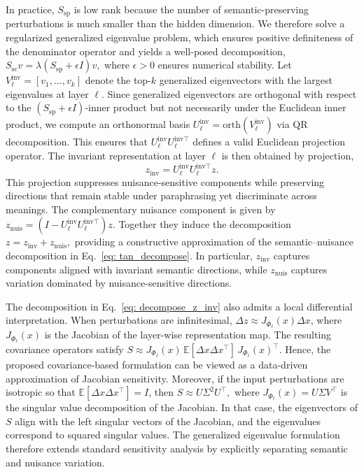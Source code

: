 In practice, $S_{\mathrm{sp}}$ is low rank because the number of semantic-preserving perturbations is much smaller than the hidden dimension. We therefore solve a regularized generalized eigenvalue problem, which ensures positive definiteness of the denominator operator and yields a well-posed decomposition,
\(
S_{\mathrm{sc}} v = \lambda (S_{\mathrm{sp}} + \epsilon I)v,
\)
where $\epsilon > 0$ ensures numerical stability. Let $V_{\ell}^{\mathrm{inv}} = [v_1, \ldots, v_k]$ denote the top-$k$ generalized eigenvectors with the largest eigenvalues at layer $\ell$. 
Since generalized eigenvectors are orthogonal with respect to the $(S_{\mathrm{sp}} + \epsilon I)$-inner product but not necessarily under the Euclidean inner product, we compute an orthonormal basis
\(
U_\ell^{\mathrm{inv}} = \mathrm{orth}(V_\ell^{\mathrm{inv}})
\)
via QR decomposition. This ensures that $U_\ell^{\mathrm{inv}} U_\ell^{\mathrm{inv}\top}$ defines a valid Euclidean projection operator. 
The invariant representation at layer $\ell$ is then obtained by projection,
\begin{equation}
z_{\mathrm{inv}}
=
U_\ell^{\mathrm{inv}}
U_\ell^{\mathrm{inv}\top} z .
\label{eq: decompose_z_inv}
\end{equation}
This projection suppresses nuisance-sensitive components while preserving directions that remain stable under paraphrasing yet discriminate across meanings. 
The complementary nuisance component is given by
\(
z_{\mathrm{nuis}}
=
\left(
I-
U_\ell^{\mathrm{inv}}
U_\ell^{\mathrm{inv}\top}
\right) z.
\)
Together they induce the decomposition
\(
z = z_{\mathrm{inv}} + z_{\mathrm{nuis}},
\)
providing a constructive approximation of the semantic--nuisance decomposition in Eq.~\ref{eq: tan_decompose}. In particular, \(z_{\mathrm{inv}}\) captures components aligned with invariant semantic directions, while \(z_{\mathrm{nuis}}\) captures variation dominated by nuisance-sensitive directions.

The decomposition in Eq.~\ref{eq: decompose_z_inv} also admits a local differential interpretation. When perturbations are infinitesimal, \(\Delta z \approx J_{\Phi_\ell}(x)\Delta x\), where \(J_{\Phi_\ell}(x)\) is the Jacobian of the layer-wise representation map. The resulting covariance operators satisfy
\(
S \approx J_{\Phi_\ell}(x)\,\mathbb{E}[\Delta x \Delta x^\top]\,J_{\Phi_\ell}(x)^\top.
\)
Hence, the proposed covariance-based formulation can be viewed as a data-driven approximation of Jacobian sensitivity. Moreover, if the input perturbations are isotropic so that \(\mathbb{E}[\Delta x \Delta x^\top]=I\), then
\(
S \approx U \Sigma^2 U^\top,
\)
where \(J_{\Phi_\ell}(x)=U\Sigma V^\top\) is the singular value decomposition of the Jacobian. In that case, the eigenvectors of \(S\) align with the left singular vectors of the Jacobian, and the eigenvalues correspond to squared singular values. The generalized eigenvalue formulation therefore extends standard sensitivity analysis by explicitly separating semantic and nuisance variation.


